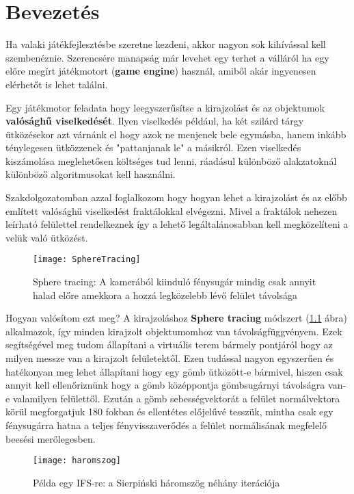 \chapter{Bevezetés} %
\label{ch:intro}

Ha valaki játékfejlesztésbe szeretne kezdeni, akkor nagyon sok kihívással kell szembenéznie. Szerencsére manapság már levehet egy terhet a válláról ha egy előre megírt játékmotort (\textbf{game engine}) használ, amiből akár ingyenesen elérhetőt is lehet találni.

Egy játékmotor feladata hogy leegyszerűsítse a kirajzolást és az objektumok \textbf{valósághű viselkedését}. Ilyen viselkedés például, ha két szilárd tárgy ütközésekor azt várnánk el hogy azok ne menjenek bele egymásba, hanem inkább ténylegesen ütközzenek és "pattanjanak le" a másikról. Ezen viselkedés kiszámolása meglehetősen költséges tud lenni, ráadásul különböző alakzatoknál különböző algoritmusokat kell használni.

Szakdolgozatomban azzal foglalkozom hogy hogyan lehet a kirajzolást és az előbb említett valósághű viselkedést fraktálokkal elvégezni. Mivel a fraktálok nehezen leírható felülettel rendelkeznek így a lehető legáltalánosabban kell megközelíteni a velük való ütközést. 


\begin{figure}[H]
	\centering
	\texttt{[image: SphereTracing]}
	\caption{Sphere tracing: A kamerából kiinduló fénysugár mindig csak annyit halad előre amekkora a hozzá legközelebb lévő felület távolsága \cite{Raymarch94:online}}
	\label{fig:SphereTracing}
\end{figure}

Hogyan valósítom ezt meg? A kirajzoláshoz \textbf{Sphere tracing} módszert (\ref{fig:SphereTracing} ábra) alkalmazok, így minden kirajzolt objektumomhoz van távolságfüggvényem. Ezek segítségével meg tudom állapítani a virtuális terem bármely pontjáról hogy az milyen messze van a kirajzolt felületektől. Ezen tudással nagyon egyszerűen és hatékonyan meg lehet állapítani hogy egy gömb ütközött-e bármivel, hiszen csak annyit kell ellenőriznünk hogy a gömb középpontja gömbsugárnyi távolságra van-e valamilyen felülettől. Ezután a gömb sebességvektorát a felület normálvektora körül megforgatjuk 180 fokban és ellentétes előjelűvé tesszük, mintha csak egy fénysugárra hatna a teljes fényvisszaverődés a felület normálisának megfelelő beesési merőlegesben.

\begin{figure}[H]
	\centering
	\texttt{[image: haromszog]}
	\caption{Példa egy IFS-re: a Sierpiński háromszög néhány iterációja \cite{Sierpins37:online}}
	\label{fig:Ifs}
\end{figure}

